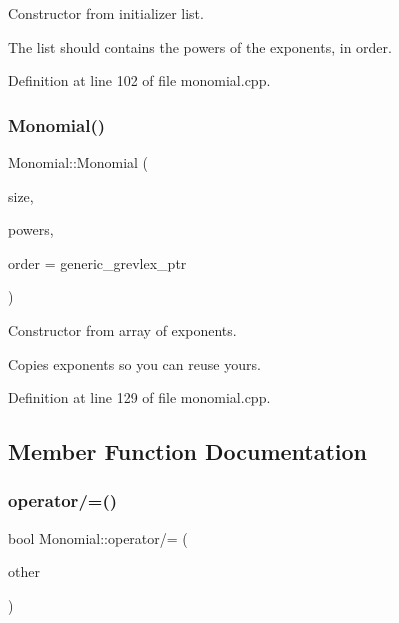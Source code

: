 Constructor from initializer list. 

The list should contains the powers of the exponents, in order. 

Definition at line 102 of file monomial.\+cpp.

\mbox{\label{class_monomial_ad231cf8d07380505ff124e9c5b6087d5}} 
\subsubsection{\texorpdfstring{Monomial()}{Monomial()}\hspace{0.1cm}{\footnotesize\ttfamily [2/2]}}
{\footnotesize\ttfamily Monomial\+::\+Monomial (\begin{DoxyParamCaption}\item[{N\+V\+A\+R\+\_\+\+T\+Y\+PE}]{size,  }\item[{const E\+X\+P\+\_\+\+T\+Y\+PE $\ast$}]{powers,  }\item[{\hyperlink{class_monomial___ordering}{Monomial\+\_\+\+Ordering} $\ast$}]{order = {\ttfamily generic\+\_\+grevlex\+\_\+ptr} }\end{DoxyParamCaption})}



Constructor from array of exponents. 

Copies exponents so you can reuse yours. 

Definition at line 129 of file monomial.\+cpp.



\subsection{Member Function Documentation}
\mbox{\label{class_monomial_a764a69f76747cf8f5f58ef6473028204}} 
\subsubsection{\texorpdfstring{operator/=()}{operator/=()}}
{\footnotesize\ttfamily bool Monomial\+::operator/= (\begin{DoxyParamCaption}\item[{const \hyperlink{class_monomial}{Monomial} \&}]{other }\end{DoxyParamCaption})}



